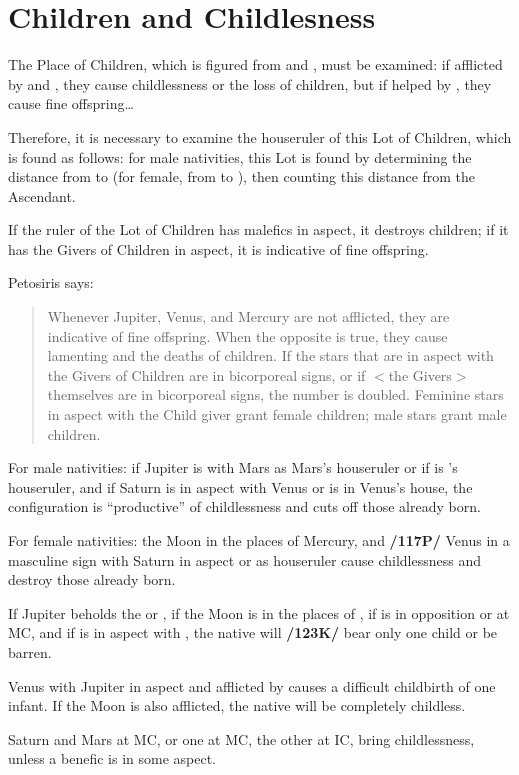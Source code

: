 \section{Children and Childlesness}
The Place of Children, which is figured from \Mercury\xspace and \Venus, must be examined: if afflicted by \Saturn\xspace and \Mars, they cause childlessness or the loss of children, but if helped by \Jupiter, they cause fine offspring\ldots

Therefore, it is necessary to examine the houseruler of this Lot of Children, which is found as follows: for male nativities, this Lot is found by determining the distance from \Jupiter\xspace to \Mercury\xspace (for female, from \Jupiter\xspace to \Venus), then counting this distance from the Ascendant. 

If the ruler of the Lot of Children has malefics in aspect, it destroys children; if it has the Givers of Children in aspect, it is indicative of fine offspring.

Petosiris says:\begin{quote}Whenever Jupiter, Venus, and Mercury are not afflicted, they are indicative of fine offspring. When the opposite is true, they cause lamenting and the deaths of children. If the stars that are in aspect with the Givers of Children are in bicorporeal signs, or if $<$the Givers$>$ themselves are in bicorporeal signs, the number is doubled. Feminine stars in aspect with the Child giver grant female children; male stars grant male children.\end{quote}

For male nativities: if Jupiter is with Mars as Mars’s houseruler or if \Mars\xspace is \Jupiter’s houseruler, and if Saturn is in aspect with Venus or is in Venus's house, the configuration is “productive” of childlessness and cuts off those already born.

For female nativities: the Moon in the places of Mercury, and \textbf{/117P/} Venus in a masculine sign with Saturn in aspect or as houseruler cause childlessness and destroy those already born. 

If Jupiter beholds the \Moon\xspace or \Venus, if the Moon is in the places of \Mercury, if \Saturn\xspace is in opposition or at MC, and if \Mars\xspace is in aspect with \Saturn, the native will \textbf{/123K/} bear only one child or be barren. 

Venus with Jupiter in aspect and afflicted by \Saturn\xspace causes a difficult childbirth of one infant. If the Moon is also afflicted, the native will be completely childless. 

Saturn and Mars at MC, or one at MC, the other at IC, bring childlessness, unless a benefic is in some aspect.

\newpage